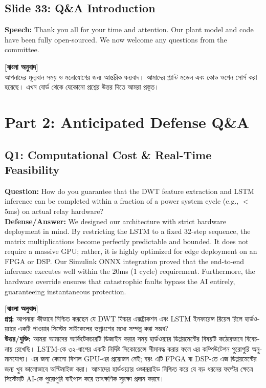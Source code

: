 \documentclass[12pt]{article}
\begin{document}
\subsection*{Slide 33: Q\&A Introduction}
\textbf{Speech:} Thank you all for your time and attention. Our plant model and code have been fully open-sourced. We now welcome any questions from the committee.

\begin{bengali}
\textbf{[বাংলা অনুবাদ]} \\
আপনাদের মূল্যবান সময় ও মনোযোগের জন্য আন্তরিক ধন্যবাদ। আমাদের প্ল্যান্ট মডেল এবং কোড ওপেন সোর্স করা হয়েছে। এখন বোর্ড থেকে যেকোনো প্রশ্নের উত্তর দিতে আমরা প্রস্তুত।
\end{bengali}

\newpage
\section*{Part 2: Anticipated Defense Q\&A}

\subsection*{Q1: Computational Cost \& Real-Time Feasibility}
\textbf{Question:} How do you guarantee that the DWT feature extraction and LSTM inference can be completed within a fraction of a power system cycle (e.g., $<$ 5ms) on actual relay hardware? \\
\textbf{Defense/Answer:} We designed our architecture with strict hardware deployment in mind. By restricting the LSTM to a fixed 32-step sequence, the matrix multiplications become perfectly predictable and bounded. It does not require a massive GPU; rather, it is highly optimized for edge deployment on an FPGA or DSP. Our Simulink ONNX integration proved that the end-to-end inference executes well within the 20ms (1 cycle) requirement. Furthermore, the hardware override ensures that catastrophic faults bypass the AI entirely, guaranteeing instantaneous protection.

\begin{bengali}
\textbf{[বাংলা অনুবাদ]} \\
\textbf{প্রশ্ন:} আপনারা কীভাবে নিশ্চিত করছেন যে DWT ফিচার এক্সট্রাকশন এবং LSTM ইনফারেন্স রিয়েল রিলে হার্ডওয়্যারে একটি পাওয়ার সিস্টেম সাইকেলের ভগ্নাংশের মধ্যে সম্পন্ন করা সম্ভব? \\
\textbf{উত্তর/যুক্তি:} আমরা আমাদের আর্কিটেকচারটি ডিজাইন করার সময় হার্ডওয়্যার ডিপ্লয়মেন্টের বিষয়টি কঠোরভাবে বিবেচনায় রেখেছি। LSTM-কে ৩২-ধাপের একটি নির্দিষ্ট সিকোয়েন্সে সীমাবদ্ধ করার ফলে এর কম্পিউটেশন পুরোপুরি অনুমানযোগ্য। এর জন্য কোনো বিশাল GPU-এর প্রয়োজন নেই; বরং এটি FPGA বা DSP-তে এজ ডিপ্লয়মেন্টের জন্য খুব ভালোভাবে অপ্টিমাইজ করা। আমাদের হার্ডওয়্যার ওভাররাইড নিশ্চিত করে যে বড় ধরনের ফল্টের ক্ষেত্রে সিস্টেমটি AI-কে পুরোপুরি বাইপাস করে তাৎক্ষণিক সুরক্ষা প্রদান করবে।
\end{bengali}
\end{document}
